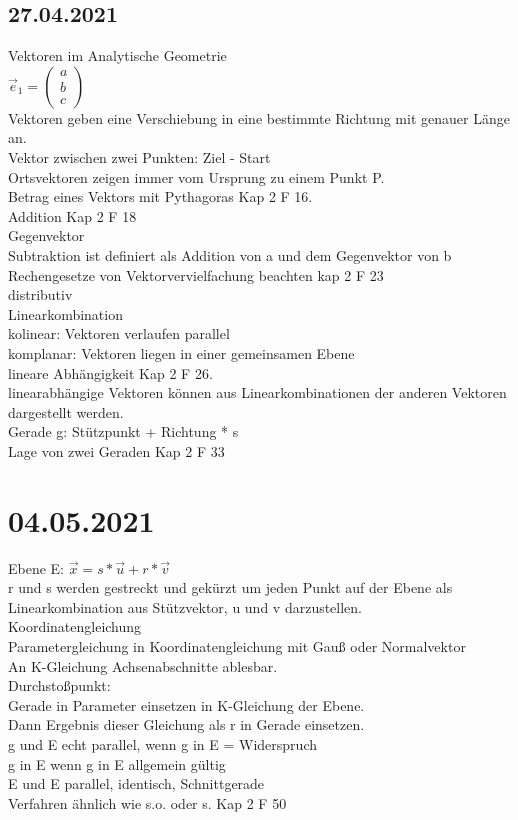 \documentclass{article}
\begin{document}
	\subsection*{27.04.2021}
	Vektoren im Analytische Geometrie \\
	$
	\vec{e}_1= \left(\begin{array}{c} a \\ b \\ c \end{array}\right)
	$  \\
	Vektoren geben eine Verschiebung in eine  bestimmte Richtung mit genauer Länge an. \\
	Vektor zwischen zwei Punkten: Ziel - Start \\
	Ortsvektoren zeigen immer vom Ursprung zu einem Punkt P. \\
	Betrag eines Vektors mit Pythagoras Kap 2 F 16. \\
	Addition Kap 2 F 18 \\
	Gegenvektor \\
	Subtraktion ist definiert als Addition von a und dem Gegenvektor von b \\
	Rechengesetze von Vektorvervielfachung beachten kap 2 F 23 \\
	distributiv \\
	Linearkombination \\
	kolinear: Vektoren verlaufen parallel \\
	komplanar: Vektoren liegen in einer gemeinsamen Ebene \\
	lineare Abhängigkeit Kap 2 F 26. \\
	linearabhängige Vektoren können aus Linearkombinationen der anderen Vektoren dargestellt werden.\\
	Gerade g: Stützpunkt + Richtung * s \\
	Lage von zwei Geraden Kap 2 F 33 \\
	\section*{04.05.2021}
	Ebene E: $\vec{x} = s*\vec{u} + r*\vec{v}$ \\
	r und s werden gestreckt und gekürzt um jeden Punkt auf der Ebene als Linearkombination aus Stützvektor, u und v darzustellen. \\
	Koordinatengleichung \\
	Parametergleichung in Koordinatengleichung mit Gauß oder Normalvektor \\
	An K-Gleichung Achsenabschnitte ablesbar. \\
	Durchstoßpunkt: \\
	Gerade in Parameter einsetzen in K-Gleichung der Ebene. \\
	Dann Ergebnis dieser Gleichung als r in Gerade einsetzen. \\
	g und E echt parallel, wenn g in E = Widerspruch \\
	g in E wenn g in E allgemein gültig \\
	E und E parallel, identisch, Schnittgerade \\
	Verfahren ähnlich wie s.o. oder s. Kap 2 F 50 \\
\end{document}
